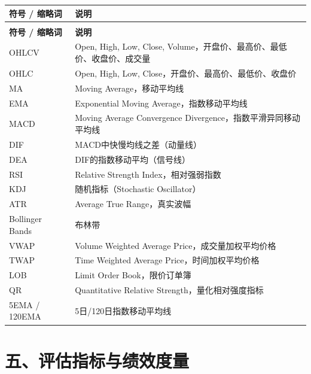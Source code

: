 \begin{longtable}{>{\raggedright\arraybackslash}p{4cm} p{10cm}}
\toprule
\textbf{符号 / 缩略词} & \textbf{说明} \\
\midrule
\endfirsthead
\multicolumn{2}{c}{\tablename\ -- 续表} \\
\toprule
\textbf{符号 / 缩略词} & \textbf{说明} \\
\midrule
\endhead
\bottomrule
\endlastfoot

OHLCV & Open, High, Low, Close, Volume，开盘价、最高价、最低价、收盘价、成交量 \\
OHLC & Open, High, Low, Close，开盘价、最高价、最低价、收盘价 \\
MA & Moving Average，移动平均线 \\
EMA & Exponential Moving Average，指数移动平均线 \\
MACD & Moving Average Convergence Divergence，指数平滑异同移动平均线 \\
DIF & MACD中快慢均线之差（动量线） \\
DEA & DIF的指数移动平均（信号线） \\
RSI & Relative Strength Index，相对强弱指数 \\
KDJ & 随机指标（Stochastic Oscillator） \\
ATR & Average True Range，真实波幅 \\
Bollinger Bands & 布林带 \\
VWAP & Volume Weighted Average Price，成交量加权平均价格 \\
TWAP & Time Weighted Average Price，时间加权平均价格 \\
LOB & Limit Order Book，限价订单簿 \\
QR & Quantitative Relative Strength，量化相对强度指标 \\
5EMA / 120EMA & 5日/120日指数移动平均线 \\
\end{longtable}

\section*{五、评估指标与绩效度量}

